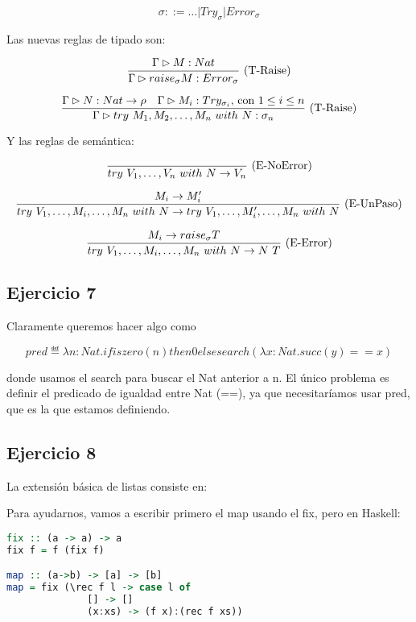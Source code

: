 \[\sigma ::= \dots \vert Try_\sigma \vert Error_\sigma\]

Las nuevas reglas de tipado son:

\[\frac{\Gamma \rhd M : Nat}{\Gamma \rhd raise_\sigma M : Error_\sigma}\ \text{(T-Raise)}\]

\[\frac{\Gamma \rhd N : Nat \to \rho\quad \Gamma \rhd M_i : Try_{\sigma_i}\text{, con $1 \leq i \leq n$}}{\Gamma \rhd try\ M_1, M_2, \dots, M_n\ with\ N : \sigma_n}\ \text{(T-Raise)}\]

Y las reglas de semántica:

\[\frac{}{try\ V_1, \dots, V_n\ with\ N \to V_n}\ \text{(E-NoError)}\]

\[\deriv{M_i \to M_i'}{try\ V_1, \dots, M_i ,\dots, M_n\ with\ N \to try\ V_1, \dots, M_i' ,\dots, M_n\ with\ N}{E-UnPaso}\]

\[\frac{M_i \to raise_\sigma T}{try\ V_1, \dots, M_i ,\dots, M_n\ with\ N \to N\ T}\ \text{(E-Error)}\]


\subsection*{Ejercicio 7}

Claramente queremos hacer algo como

\[pred \eqdef \lambda n : Nat. if iszero(n) then 0 else search (\lambda x: Nat. succ(y) == x)\]

donde usamos el search para buscar el Nat anterior a n. El único problema es definir el predicado de igualdad entre Nat (==), ya que necesitaríamos usar pred, que es la que estamos definiendo.


\subsection*{Ejercicio 8} La extensión básica de listas consiste en:


Para ayudarnos, vamos a escribir primero el map usando el fix, pero en Haskell:

\begin{lstlisting}[language=Haskell]
fix :: (a -> a) -> a
fix f = f (fix f)

map :: (a->b) -> [a] -> [b]
map = fix (\rec f l -> case l of
              [] -> []
              (x:xs) -> (f x):(rec f xs))
\end{lstlisting}

